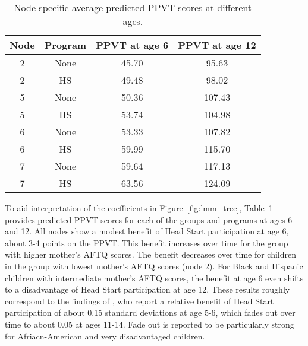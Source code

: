 \documentclass[doc,floatsintext,natbib]{apa7}
\newcommand{\edc}[1]{\textcolor{blue}{#1}}
\begin{document}
\FloatBarrier

\begin{table}

\caption{\label{tab:predictions}Node-specific average predicted PPVT scores at different ages.}
\begin{tabular}[t]{cccc}
\toprule
Node & Program & PPVT at age 6 & PPVT at age 12\\
\midrule
2 & None & 45.70 & 95.63\\
2 & HS & 49.48 & 98.02\\
5 & None & 50.36 & 107.43\\
5 & HS & 53.74 & 104.98\\
6 & None & 53.33 & 107.82\\
6 & HS & 59.99 & 115.70\\
7 & None & 59.64 & 117.13\\
7 & HS & 63.56 & 124.09\\
\bottomrule
\end{tabular}
\end{table}
To aid interpretation of the coefficients in Figure~\ref{fig:lmm_tree}, Table~\ref{tab:predictions} provides predicted PPVT scores for each of the groups and programs at ages 6 and 12. All nodes show a modest benefit of Head Start participation at age 6, about 3-4 points on the PPVT. This benefit increases over time for the group with higher mother's AFTQ scores. The benefit decreases over time for children in the group with lowest mother's AFTQ scores (node 2). For Black and Hispanic children with intermediate mother's AFTQ scores, the benefit at age 6 even shifts to a disadvantage of Head Start participation at age 12. These results roughly correspond to the findings of \cite{Demi09}, who report a relative benefit of Head Start participation of about 0.15 standard deviations at age 5-6, which fades out over time to about 0.05 at ages 11-14. Fade out is reported to be particularly strong for Afriacn-American and very disadvantaged children.


\end{document}
